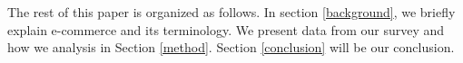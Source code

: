 \documentclass[conference]{IEEEtran}
\begin{document}
The rest of this paper is organized as follows. In section \ref{background}, we briefly explain e-commerce and its terminology. We present data from our survey and how we analysis in Section \ref{method}. Section \ref{conclusion} will be our conclusion.






%
%



%
%
\end{document}
